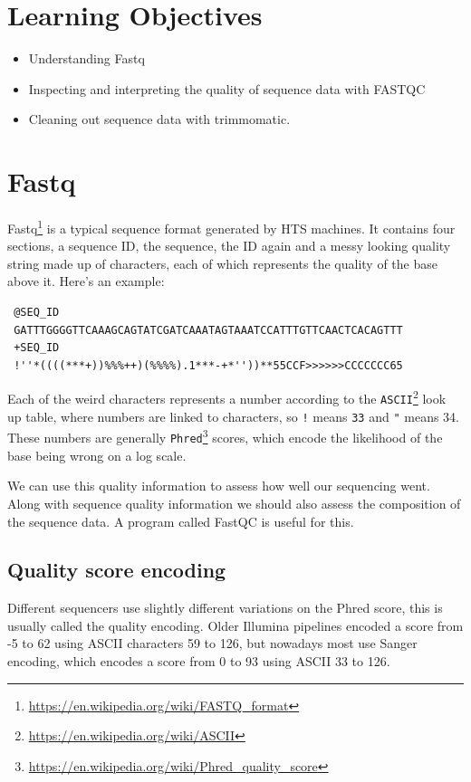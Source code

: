 \documentclass[12pt,]{book}
\providecommand{\tightlist}{%
  \setlength{\itemsep}{0pt}\setlength{\parskip}{0pt}}
\let\rmarkdownfootnote\footnote%
\def\footnote{\protect\rmarkdownfootnote}
\renewcommand{\href}[2]{#2\footnote{\url{#1}}}
\begin{document}
\section{Learning Objectives}\label{learning-objectives-1}

\begin{itemize}
\tightlist
\item
  Understanding Fastq
\item
  Inspecting and interpreting the quality of sequence data with FASTQC
\item
  Cleaning out sequence data with trimmomatic.
\end{itemize}

\section{Fastq}\label{fastq}

\href{https://en.wikipedia.org/wiki/FASTQ_format}{Fastq} is a typical
sequence format generated by HTS machines. It contains four sections, a
sequence ID, the sequence, the ID again and a messy looking quality
string made up of characters, each of which represents the quality of
the base above it. Here's an example:

\begin{verbatim}
 @SEQ_ID
 GATTTGGGGTTCAAAGCAGTATCGATCAAATAGTAAATCCATTTGTTCAACTCACAGTTT
 +SEQ_ID
 !''*((((***+))%%%++)(%%%%).1***-+*''))**55CCF>>>>>>CCCCCCC65
\end{verbatim}

Each of the weird characters represents a number according to the
\href{https://en.wikipedia.org/wiki/ASCII}{\texttt{ASCII}} look up
table, where numbers are linked to characters, so \texttt{!} means
\texttt{33} and \texttt{"} means 34. These numbers are generally
\href{https://en.wikipedia.org/wiki/Phred_quality_score}{\texttt{Phred}}
scores, which encode the likelihood of the base being wrong on a log
scale.

We can use this quality information to assess how well our sequencing
went. Along with sequence quality information we should also assess the
composition of the sequence data. A program called FastQC \citep{FastQC}
is useful for this.

\subsection{Quality score encoding}\label{quality-score-encoding}

Different sequencers use slightly different variations on the Phred
score, this is usually called the quality encoding. Older Illumina
pipelines encoded a score from -5 to 62 using ASCII characters 59 to
126, but nowadays most use Sanger encoding, which encodes a score from 0
to 93 using ASCII 33 to 126.
\end{document}
